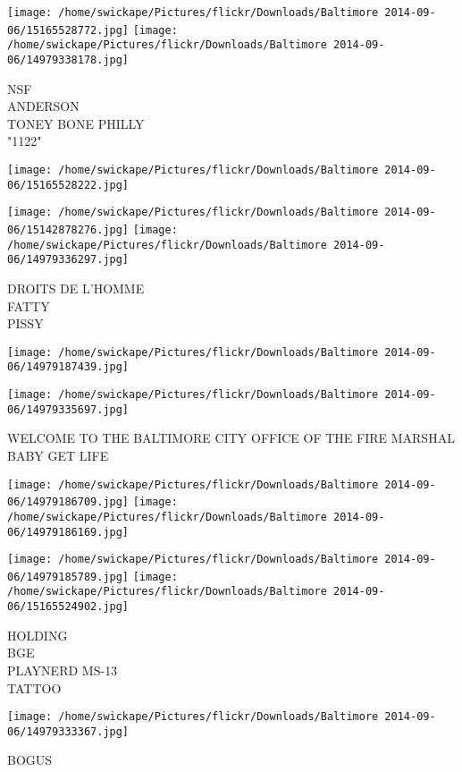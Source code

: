 \documentclass[10pt,letterpaper]{article}
\begin{document}
\texttt{[image: /home/swickape/Pictures/flickr/Downloads/Baltimore 2014-09-06/15165528772.jpg]}
\texttt{[image: /home/swickape/Pictures/flickr/Downloads/Baltimore 2014-09-06/14979338178.jpg]}

NSF\\
ANDERSON\\
TONEY BONE PHILLY\\
"1122"\\
\pagebreak

\texttt{[image: /home/swickape/Pictures/flickr/Downloads/Baltimore 2014-09-06/15165528222.jpg]}

\vspace{0.25in}
\texttt{[image: /home/swickape/Pictures/flickr/Downloads/Baltimore 2014-09-06/15142878276.jpg]}
\texttt{[image: /home/swickape/Pictures/flickr/Downloads/Baltimore 2014-09-06/14979336297.jpg]}

DROITS DE L'HOMME\\
FATTY\\
PISSY\\
\pagebreak

\texttt{[image: /home/swickape/Pictures/flickr/Downloads/Baltimore 2014-09-06/14979187439.jpg]}

\vspace{0.25in}
\texttt{[image: /home/swickape/Pictures/flickr/Downloads/Baltimore 2014-09-06/14979335697.jpg]}

WELCOME TO THE BALTIMORE CITY OFFICE OF THE FIRE MARSHAL\\
BABY GET LIFE\\
\pagebreak

\texttt{[image: /home/swickape/Pictures/flickr/Downloads/Baltimore 2014-09-06/14979186709.jpg]}
\texttt{[image: /home/swickape/Pictures/flickr/Downloads/Baltimore 2014-09-06/14979186169.jpg]}

\texttt{[image: /home/swickape/Pictures/flickr/Downloads/Baltimore 2014-09-06/14979185789.jpg]}
\texttt{[image: /home/swickape/Pictures/flickr/Downloads/Baltimore 2014-09-06/15165524902.jpg]}

HOLDING\\
BGE\\
PLAYNERD MS{-}13\\
TATTOO\\
\pagebreak

\texttt{[image: /home/swickape/Pictures/flickr/Downloads/Baltimore 2014-09-06/14979333367.jpg]}

BOGUS\\
\pagebreak
\end{document}
